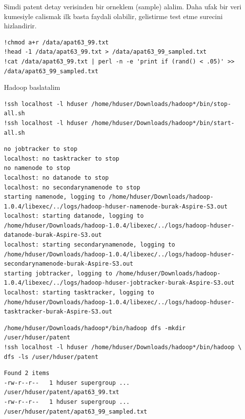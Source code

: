 \documentclass[12pt,fleqn]{article}\usepackage{../common}
\begin{document}
Simdi patent detay verisinden bir orneklem (sample) alalim. Daha ufak bir
veri kumesiyle calismak ilk basta faydali olabilir, gelistirme test etme
surecini hizlandirir.

\begin{verbatim}
!chmod a+r /data/apat63_99.txt
!head -1 /data/apat63_99.txt > /data/apat63_99_sampled.txt
!cat /data/apat63_99.txt | perl -n -e 'print if (rand() < .05)' >> /data/apat63_99_sampled.txt
\end{verbatim}

Hadoop baslatalim

\begin{verbatim}
!ssh localhost -l hduser /home/hduser/Downloads/hadoop*/bin/stop-all.sh
!ssh localhost -l hduser /home/hduser/Downloads/hadoop*/bin/start-all.sh
\end{verbatim}

\begin{verbatim}
no jobtracker to stop
localhost: no tasktracker to stop
no namenode to stop
localhost: no datanode to stop
localhost: no secondarynamenode to stop
starting namenode, logging to /home/hduser/Downloads/hadoop-1.0.4/libexec/../logs/hadoop-hduser-namenode-burak-Aspire-S3.out
localhost: starting datanode, logging to /home/hduser/Downloads/hadoop-1.0.4/libexec/../logs/hadoop-hduser-datanode-burak-Aspire-S3.out
localhost: starting secondarynamenode, logging to /home/hduser/Downloads/hadoop-1.0.4/libexec/../logs/hadoop-hduser-secondarynamenode-burak-Aspire-S3.out
starting jobtracker, logging to /home/hduser/Downloads/hadoop-1.0.4/libexec/../logs/hadoop-hduser-jobtracker-burak-Aspire-S3.out
localhost: starting tasktracker, logging to /home/hduser/Downloads/hadoop-1.0.4/libexec/../logs/hadoop-hduser-tasktracker-burak-Aspire-S3.out
\end{verbatim}

\begin{verbatim}
/home/hduser/Downloads/hadoop*/bin/hadoop dfs -mkdir /user/hduser/patent
!ssh localhost -l hduser /home/hduser/Downloads/hadoop*/bin/hadoop \
dfs -ls /user/hduser/patent
\end{verbatim}

\begin{verbatim}
Found 2 items
-rw-r--r--   1 hduser supergroup ...  /user/hduser/patent/apat63_99.txt
-rw-r--r--   1 hduser supergroup ...   /user/hduser/patent/apat63_99_sampled.txt
\end{verbatim}
\end{document}
